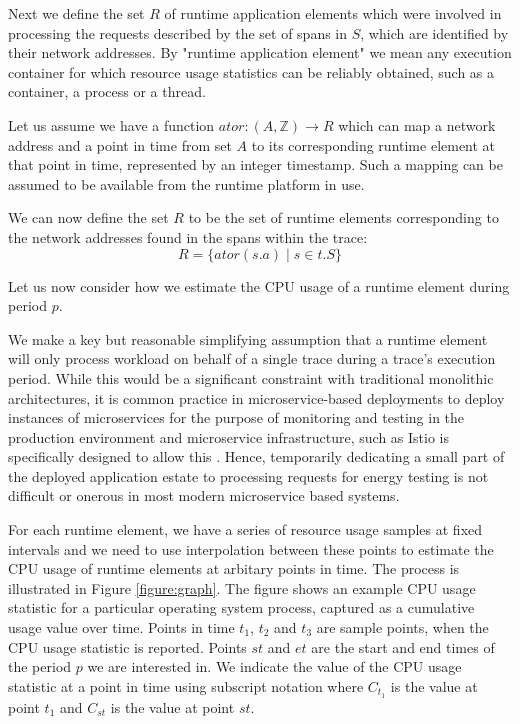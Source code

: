 Next we define the set $R$ of runtime application elements which were involved in processing the requests described by the set of spans in $S$, which are identified by their network addresses.  By "runtime application element" we mean any execution container for which resource usage statistics can be reliably obtained, such as a container, a process or a thread.

Let us assume we have a function $ator : (A,\mathbb{Z}) \to R$ which can map a network address and a point in time from set $A$ to its corresponding runtime element at that point in time, represented by an integer timestamp.  Such a mapping can be assumed to be available from the runtime platform in use.

We can now define the set $R$ to be the set of runtime elements corresponding to the network addresses found in the spans within the trace:
\begin{equation}
R = \{ ator(s.a) \mid s \in t.S \}
\end{equation}

Let us now consider how we estimate the CPU usage of a runtime element during period $p$.  

We make a key but reasonable simplifying assumption that a runtime element will only process workload on behalf of a single trace during a trace's execution period.  While this would be a significant constraint with traditional monolithic architectures, it is common practice in microservice-based deployments to deploy instances of microservices for the purpose of monitoring and testing in the production environment \cite{hilton2017-darklaunch} and microservice infrastructure, such as Istio is specifically designed to allow this \cite{istio2018-mirroring}.  Hence, temporarily dedicating a small part of the deployed application estate to processing requests for energy testing is not difficult or onerous in most modern microservice based systems.

For each runtime element, we have a series of resource usage samples at fixed intervals and we need to use interpolation between these points to estimate the CPU usage of runtime elements at arbitary points in time. The process is illustrated in Figure \ref{figure:graph}.  The figure shows an example CPU usage statistic for a particular operating system process, captured as a cumulative usage value over time.  Points in time $t_{1}$, $t_{2}$ and $t_{3}$ are sample points, when the CPU usage statistic is reported.  Points $st$ and $et$ are the start and end times of the period $p$ we are interested in.  We indicate the value of the CPU usage statistic at a point in time using subscript notation where $C_{t_{1}}$ is the value at point $t_{1}$ and $C_{st}$ is the value at point $st$.

